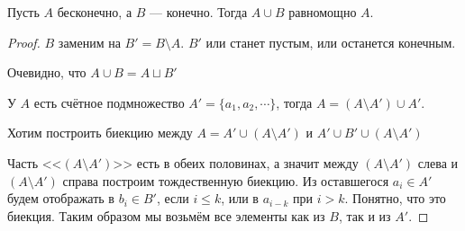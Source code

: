 \begin{lemma}
Пусть $A$ бесконечно, а $B$ --- конечно. Тогда $A \cup B$ равномощно $A$.
\end{lemma}
\begin{proof}
	$B$ заменим на $B' = B \setminus A$. $B'$ или станет пустым, или останется конечным.

	Очевидно, что $A \cup B = A \sqcup B'$

	У $A$ есть счётное подмножество $A' = \{a_1, a_2, \cdots\}$, тогда $A = (A\setminus A') \cup A'$.

	Хотим построить биекцию между $A = A' \cup (A\setminus A')$ и $A' \cup B' \cup (A\setminus A')$

	Часть <<$(A \setminus A')$>> есть в обеих половинах, а значит между $ (A \setminus A') $ слева и $ ( A \setminus A')$ справа построим тождественную биекцию. Из оставшегося $a_i \in A'$ будем отображать в $b_i \in B'$, если $i \le k$, или в $a_{i-k}$ при $i > k$. Понятно, что это биекция. Таким образом мы возьмём все элементы как из $B$, так и из $A'$.
\end{proof}

